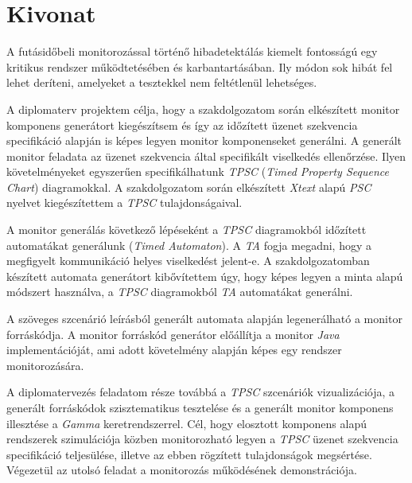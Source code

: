 \setcounter{page}{1}

\selecthungarian

\chapter*{Kivonat}

A futásidőbeli monitorozással történő hibadetektálás kiemelt fontosságú egy kritikus rendszer működtetésében és karbantartásában.
Ily módon sok hibát fel lehet deríteni, amelyeket a tesztekkel nem feltétlenül lehetséges.

A diplomaterv projektem célja, hogy a szakdolgozatom során elkészített monitor komponens generátort kiegészítsem és így az időzített üzenet szekvencia specifikáció alapján is képes legyen monitor komponenseket generálni.
A generált monitor feladata az üzenet szekvencia által specifikált viselkedés ellenőrzése.
Ilyen követelményeket egyszerűen specifikálhatunk \textit{TPSC} (\textit{Timed Property Sequence Chart}) diagramokkal.
A szakdolgozatom során elkészített \textit{Xtext} alapú \textit{PSC} nyelvet kiegészítettem a \textit{TPSC} tulajdonságaival.

A monitor generálás következő lépéseként a \textit{TPSC} diagramokból időzített automatákat generálunk (\textit{Timed Automaton}).
A \textit{TA} fogja megadni, hogy a megfigyelt kommunikáció helyes viselkedést jelent-e.
A szakdolgozatomban készített automata generátort kibővítettem úgy, hogy képes legyen a minta alapú módszert használva, a \textit{TPSC} diagramokból \textit{TA} automatákat generálni.

A szöveges szcenárió leírásból generált automata alapján legenerálható a monitor forráskódja.
A monitor forráskód generátor előállítja a monitor \textit{Java} implementációját, ami adott követelmény alapján képes egy rendszer monitorozására.

A diplomatervezés feladatom része továbbá a \textit{TPSC} szcenáriók vizualizációja, a generált forráskódok szisztematikus tesztelése és a generált monitor komponens illesztése a \textit{Gamma} keretrendszerrel.
Cél, hogy elosztott komponens alapú rendszerek szimulációja közben monitorozható legyen a \textit{TPSC} üzenet szekvencia specifikáció teljesülése, illetve az ebben rögzített tulajdonságok megsértése.
Végezetül az utolsó feladat a monitorozás működésének demonstrációja.

